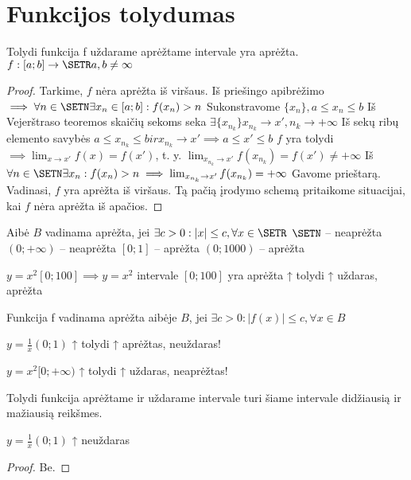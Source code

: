 \chapter{Funkcijos tolydumas}
\begin{prop}[I Vejerštraso]
  Tolydi funkcija f uždarame aprėžtame intervale yra aprėžta.
  $f : [a; b] \to \SETR a, b \neq \infty$
  \begin{proof}
    Tarkime, $f$ nėra aprėžta iš viršaus.
    Iš priešingo apibrėžimo $\implies \forall n \in \SETN \exists x_n \in [a; b] : f(x_n) > n$
    Sukonstravome $\{x_n\}, a \leq x_n \leq b$
    Iš Vejerštraso teoremos skaičių sekoms seka
    $\exists \{x_{n_k}\} x_{n_k} \to x', n_k \to +\infty$
    Iš sekų ribų elemento savybės $a \leq x_{n_k} \leq b ir x_{n_k} \to x'
    \implies a \leq x' \leq b$
    $f$ yra tolydi $\implies \lim_{x \to x'}{f(x)} = f(x')$, t. y.
    $\lim_{x_{n_k} \to x'}{f(x_{n_k})} = f(x') \neq +\infty$
    Iš $\forall n \in \SETN \exists x_n : f(x_n) > n
    \implies \lim_{x_{n_k} \to x'}{f(x_{n_k})} = +\infty$
    Gavome prieštarą.
    Vadinasi, $f$ yra aprėžta iš viršaus.
    Tą pačią įrodymo schemą pritaikome situacijai, kai $f$ nėra aprėžta iš apačios.
  \end{proof}
\end{prop}
\begin{exmp}
  Aibė $B$ vadinama aprėžta, jei $\exists c > 0 : |x| \leq c, \forall x \in \SETR$
  $\SETN$ – neaprėžta
  $(0; +\infty)$ – neaprėžta
  $[0; 1]$ – aprėžta
  $(0; 1000)$ – aprėžta

  $y = x^2  [0; 100]            \implies y = x^2$ intervale $[0; 100]$ yra aprėžta
  ↑ tolydi ↑ uždaras, aprėžta
\end{exmp}
\begin{priminimas}
  Funkcija f vadinama aprėžta aibėje $B$, jei
  $\exists c > 0 : |f(x)| \leq c, \forall x \in B$
\end{priminimas}
\begin{exmp}
  $y = \frac{1}{x} (0; 1)$
           ↑ tolydi ↑ aprėžtas, neuždaras!
\end{exmp}
\begin{exmp}
  $y = x^2 [0; +\infty)$
     ↑ tolydi ↑ uždaras, neaprėžtas!
\end{exmp}


\begin{prop}[II Vejerštraso]
  Tolydi funkcija aprėžtame ir uždarame intervale turi šiame intervale
  didžiausią ir mažiausią reikšmes.
  \begin{exmp}
    $y = \frac{1}{x} (0; 1)$
                       ↑ neuždaras
  \end{exmp}
  \begin{proof}
    Be.
  \end{proof}
\end{prop}


